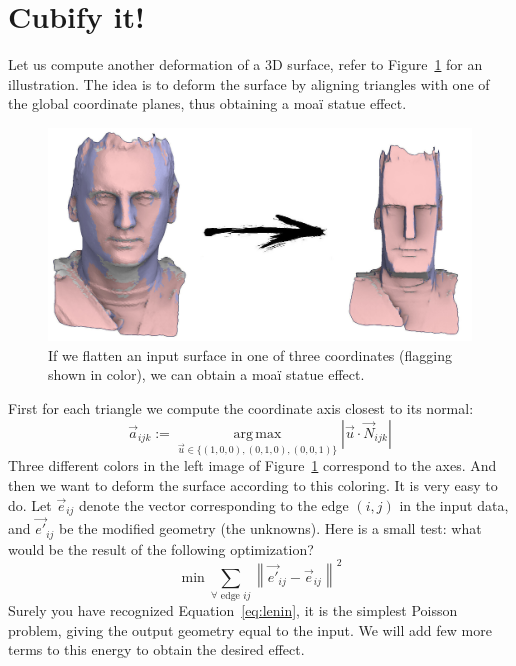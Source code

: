 \documentclass[notitlepage,oneside]{book}
\DeclareMathOperator*{\argmax}{arg\,max}
\begin{document}
\newpage
\section{Cubify it!}
\label{sec:cubify}
Let us compute another deformation of a 3D surface, refer to Figure~\ref{fig:moai} for an illustration.
The idea is to deform the surface by aligning triangles with one of the global coordinate planes, thus obtaining a moaï statue effect.
\begin{figure}[!h]
	\centering
	\includegraphics[width=.75\linewidth]{cubify-flagging.jpg}
	\caption{If we flatten an input surface in one of three coordinates (flagging shown in color), we can obtain a moaï statue effect.}
	\label{fig:moai}
\end{figure}

First for each triangle we compute the coordinate axis closest to its normal:
$$
\vec{a}_{ijk} := \argmax\limits_{\vec{u}\in \{(1,0,0), (0,1,0), (0,0,1)\}} \left|\vec{u} \cdot \vec{N}_{ijk}\right| 
$$
Three different colors in the left image of Figure~\ref{fig:moai} correspond to the axes.
And then we want to deform the surface according to this coloring.
It is very easy to do. Let $\vec{e}_{ij}$ denote the vector corresponding to the edge $(i,j)$ in the input data,
and $\vec{e'}_{ij}$ be the modified geometry (the unknowns).
Here is a small test: what would be the result of the following optimization?
$$
\min \sum\limits_{\forall \text{~edge~} ij}\left\|\vec{e'}_{ij} - \vec{e}_{ij}\right\|^2
$$
Surely you have recognized Equation~\eqref{eq:lenin}, it is the simplest Poisson problem, giving the output geometry equal to the input.
We will add few more terms to this energy to obtain the desired effect.
\end{document}
